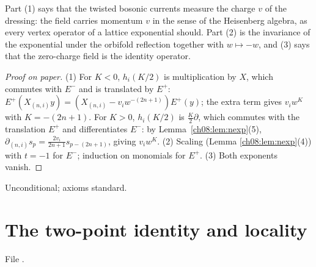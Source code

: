 \begin{physics}
Part (1) says that the twisted bosonic currents measure the charge $v$ of the dressing: the field carries momentum $v$ in the sense of the Heisenberg algebra, as every vertex operator of a lattice exponential should. Part (2) is the invariance of the exponential under the orbifold reflection together with $w\mapsto -w$, and (3) says that the zero-charge field is the identity operator.
\end{physics}
\begin{proof}[Proof on paper]
(1) For $K<0$, $h_i(K/2)$ is multiplication by $X$, which commutes with $E^-$ and is translated by
$E^+$: $E^+(X_{(n,i)}y)=(X_{(n,i)}-v_iw^{-(2n+1)})E^+(y)$; the extra term gives
$v_iw^{K}$ with $K=-(2n+1)$.  For $K>0$, $h_i(K/2)$ is $\frac K2\partial$, which commutes with the
translation $E^+$ and differentiates $E^-$: by Lemma~\ref{ch08:lem:nexp}(5),
$\partial_{(n,i)}s_p=\frac{2v_i}{2n+1}s_{p-(2n+1)}$, giving $v_iw^K$.  (2) Scaling (Lemma
\ref{ch08:lem:nexp}(4)) with $t=-1$ for $E^-$; induction on monomials for $E^+$.  (3) Both
exponents vanish.
\end{proof}
\begin{status}
Unconditional; axioms standard.
\end{status}

\section{The two-point identity and locality}\label{ch08:sec:twopoint}

File .

